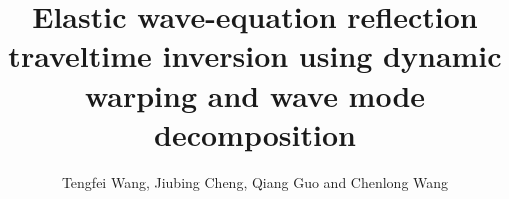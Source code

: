 %

\title{Elastic wave-equation reflection traveltime inversion using dynamic warping and wave mode
decomposition}
\author{Tengfei Wang, Jiubing Cheng, Qiang Guo and Chenlong Wang}

\maketitle



%
%
%





%

